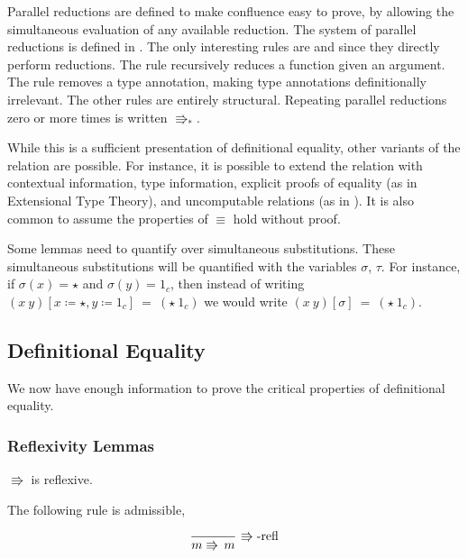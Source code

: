  Parallel reductions are defined to make confluence easy to prove, by allowing the simultaneous evaluation of any available reduction.
The system of parallel reductions is defined in .
The only interesting rules are  and  since they directly perform reductions.
The  rule recursively reduces a function given an argument.
The  rule removes a type annotation, making type annotations definitionally irrelevant.
The other rules are entirely structural.
Repeating parallel reductions zero or more times is written $\Rrightarrow_{\ast}$.
 
While this is a sufficient presentation of definitional equality, other variants of the relation are possible.
For instance, it is possible to extend the relation with contextual information, type information, explicit proofs of equality (as in Extensional Type Theory), and uncomputable relations (as in \cite{jia2010dependent}).
It is also common to assume the properties of $\equiv$ hold without proof.
 
Some lemmas need to quantify over simultaneous substitutions.
These simultaneous substitutions will be quantified with the variables $\sigma$, $\tau$.
For instance, if $\sigma(x) = \star$ and $\sigma(y) = 1_c$, then instead of writing $(x\ y)[x \coloneqq \star,y \coloneqq 1_c]\ =\ (\star\ 1_c)$ we would write $(x\ y)[\sigma]\ =\ (\star\ 1_c)$.
 
 
\subsection{Definitional Equality}
 
We now have enough information to prove the critical properties of definitional equality.
 
\subsubsection{Reflexivity Lemmas}
\begin{lem}
$\Rrightarrow$ is reflexive.
 
The following rule is admissible,
 
\[
\frac{\,}{m\Rrightarrow\,m}\,\operatorname{\Rrightarrow-refl}
\]
\end{lem}
 
